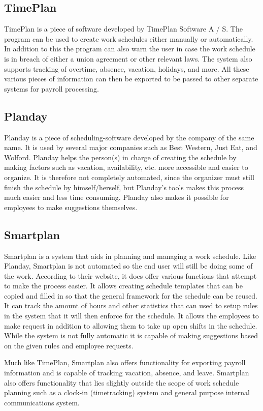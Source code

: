 \subsection{TimePlan}
TimePlan is a piece of software developed by TimePlan Software A / S. The program can be used to create work schedules either manually or automatically. In addition to this the program can also warn the user in case the work schedule is in breach of either a union agreement or other relevant laws. The system also supports tracking of overtime, absence, vacation, holidays, and more. All these various pieces of information can then be exported to be passed to other separate systems for payroll processing. \parencite{TimePlan}

\subsection{Planday}
Planday is a piece of scheduling-software developed by the company of the same name. It is used by several major companies such as Best Western, Just Eat, and Wolford. Planday helps the person(s) in charge of creating the schedule by making factors such as vacation, availability, etc. more accessible and easier to organize. It is therefore not completely automated, since the organizer must still finish the schedule by himself/herself, but Planday's tools makes this process much easier and less time consuming. Planday also makes it possible for employees to make suggestions themselves. \parencite{planday}

\subsection{Smartplan}
Smartplan is a system that aids in planning and managing a work schedule. Like Planday, Smartplan is not automated so the end user will still be doing some of the work. According to their website, it does offer various functions that attempt to make the process easier. It allows creating schedule templates that can be copied and filled in so that the general framework for the schedule can be reused.
It can track the amount of hours and other statistics that can used to setup rules in the system that it will then enforce for the schedule. It allows the employees to make request in addition to allowing them to take up open shifts in the schedule. While the system is not fully automatic it is capable of making suggestions based on the given rules and employee requests.

Much like TimePlan, Smartplan also offers functionality for exporting payroll information and is capable of tracking vacation, absence, and leave. Smartplan also offers functionality that lies slightly outside the scope of work schedule planning such as a clock-in (timetracking) system and general purpose internal communications system. \parencite{smartplan}

